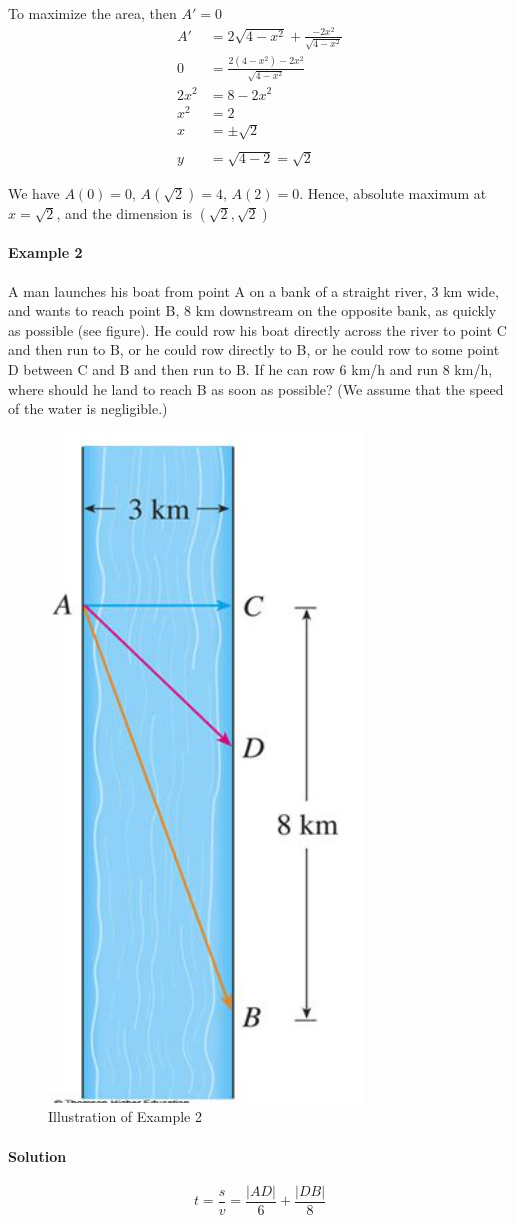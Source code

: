 \documentclass[12pt]{article}
\begin{document}
To maximize the area, then $A' = 0$
\begin{align*} 
    A' &= 2 \sqrt{4 - x^2} + \frac{ - 2x^2}{\sqrt{4 - x^2}} \\
    0 &= \frac{2(4 - x^2) - 2x^2}{\sqrt{4 - x^2}} \\
    2x^2 &= 8 - 2x^2 \\
    x^2 &= 2 \\
    x &= \pm \sqrt{2} \\ \\
    y &= \sqrt{4 - 2} = \sqrt{2}
\end{align*}

We have $A(0) = 0$, $A(\sqrt{2}) = 4$, $A(2) = 0$. Hence, absolute
maximum at $x = \sqrt{2}$, and the dimension is $(\sqrt{2}, \sqrt{2})$

\paragraph{Example 2}
A man launches his boat from point A on a bank of a straight river, 3 km wide, 
and wants to reach point B, 8 km downstream on the opposite bank, as quickly as possible (see figure). He could row his boat directly across the river to point C 
and then run to B, or he could row directly to B, or he could row to some point D between C and B and then run to B. If he can row 6 km/h and run 8 km/h, where should 
he land to reach B as soon as possible? (We assume that the speed of the water is negligible.) 

\begin{figure}[h!]
    \centering
    \includegraphics[width = 0.2\linewidth]{Images/applied example 2-1.png}
    \caption{Illustration of Example 2}
\end{figure}

\paragraph{Solution}
\[
    t = \frac{s}{v} = \frac{|AD|}{6} + \frac{|DB|}{8} 
\]
\end{document}
